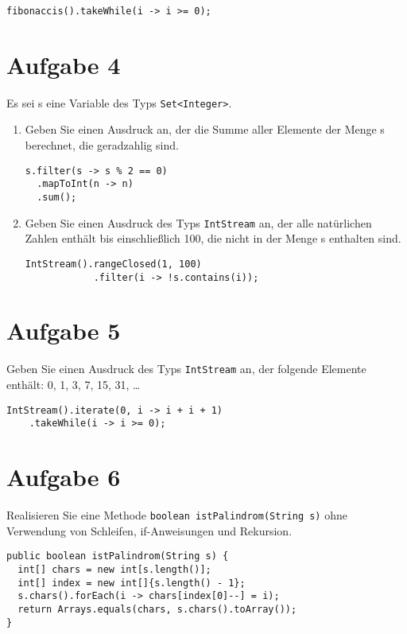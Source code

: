 \begin{lstlisting}
fibonaccis().takeWhile(i -> i >= 0);
\end{lstlisting}

\section{Aufgabe 4}
Es sei s eine Variable des Typs \lstinline{Set<Integer>}.
\begin{enumerate}
  \item Geben Sie einen Ausdruck an, der die Summe aller Elemente der Menge s
        berechnet, die geradzahlig sind.
        \begin{lstlisting}
s.filter(s -> s % 2 == 0)
  .mapToInt(n -> n)
  .sum();
\end{lstlisting}
  \item Geben Sie einen Ausdruck des Typs \lstinline{IntStream} an, der alle
        natürlichen Zahlen enthält bis einschließlich 100, die nicht in der Menge s
        enthalten sind.
                \begin{lstlisting}
IntStream().rangeClosed(1, 100)
            .filter(i -> !s.contains(i));
\end{lstlisting}
\end{enumerate}

\section{Aufgabe 5}
Geben Sie einen Ausdruck des Typs \lstinline{IntStream} an, der folgende
Elemente enthält: 0, 1, 3, 7, 15, 31, \dots

\begin{lstlisting}
IntStream().iterate(0, i -> i + i + 1)
    .takeWhile(i -> i >= 0);
\end{lstlisting}

\section{Aufgabe 6}
Realisieren Sie eine Methode \lstinline{boolean istPalindrom(String s)} ohne
Verwendung von Schleifen, if-Anweisungen und Rekursion.

\begin{lstlisting}
public boolean istPalindrom(String s) {
  int[] chars = new int[s.length()];
  int[] index = new int[]{s.length() - 1};
  s.chars().forEach(i -> chars[index[0]--] = i);
  return Arrays.equals(chars, s.chars().toArray());
}
\end{lstlisting}

